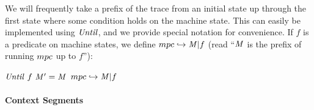 \documentclass[acmsmall,review,anonymous]{acmart}\settopmatter{printfolios=true,printccs=false,printacmref=false}
\begin{document}
We will frequently take a prefix of the trace from an initial state up
through the first state where some condition holds on the machine state.
This can easily be implemented using \(\mathit{Until}\), and we provide special notation
for convenience.
%
If \(f\) is a predicate on machine states, we define \(mpc
\hookrightarrow \mathit{M} | f\) (read ``\(\mathit{M}\) is the prefix of
running \(mpc\) up to \(f\)''):
%
\begin{center}
            {\(\mathit{Until} ~ f ~ \mathit{M}' = \mathit{M}\)}
            {\(mpc \hookrightarrow \mathit{M} | f\)}
\end{center}

\paragraph*{Context Segments}
\end{document}
